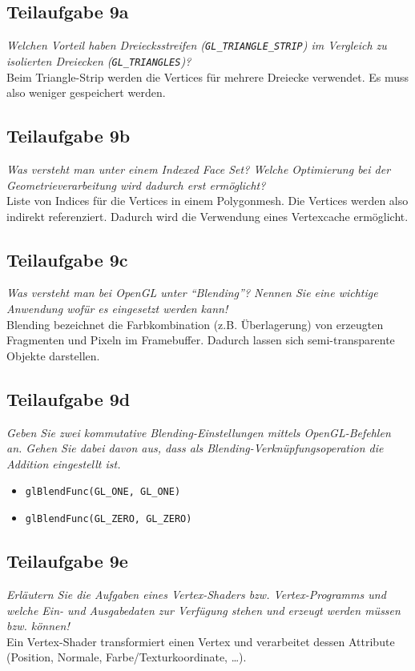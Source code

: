 \documentclass[a4paper]{scrartcl}
\begin{document}
\subsection*{Teilaufgabe 9a}
\textit{Welchen Vorteil haben Dreiecksstreifen (\texttt{GL\_TRIANGLE\_STRIP})
im Vergleich zu isolierten Dreiecken (\texttt{GL\_TRIANGLES})?}\\
Beim Triangle-Strip werden die Vertices für mehrere Dreiecke verwendet. Es muss
also weniger gespeichert werden.

\subsection*{Teilaufgabe 9b}
\textit{Was versteht man unter einem Indexed Face Set? Welche Optimierung bei
der Geometrieverarbeitung wird dadurch erst ermöglicht?}\\
Liste von Indices für die Vertices in einem Polygonmesh. Die Vertices werden
also indirekt referenziert. Dadurch wird die Verwendung eines Vertexcache
ermöglicht.

\subsection*{Teilaufgabe 9c}
\textit{Was versteht man bei OpenGL unter \enquote{Blending}? Nennen Sie eine
wichtige Anwendung wofür es eingesetzt werden kann!}\\
Blending bezeichnet die Farbkombination (z.B. Überlagerung) von erzeugten
Fragmenten und Pixeln im Framebuffer. Dadurch lassen sich semi-transparente
Objekte darstellen.

\subsection*{Teilaufgabe 9d}
\textit{Geben Sie zwei kommutative Blending-Einstellungen mittels OpenGL-Befehlen an.
Gehen Sie dabei davon aus, dass als Blending-Verknüpfungsoperation die Addition
eingestellt ist.}\\

\begin{itemize}
    \item \texttt{glBlendFunc(GL\_ONE, GL\_ONE)}
    \item \texttt{glBlendFunc(GL\_ZERO, GL\_ZERO)}
\end{itemize}

\subsection*{Teilaufgabe 9e}
\textit{Erläutern Sie die Aufgaben eines Vertex-Shaders bzw. Vertex-Programms
und welche Ein- und Ausgabedaten zur Verfügung stehen und erzeugt werden müssen
bzw. können!}\\
Ein Vertex-Shader transformiert einen Vertex und verarbeitet dessen Attribute
(Position, Normale, Farbe/Texturkoordinate, \dots).
\end{document}
